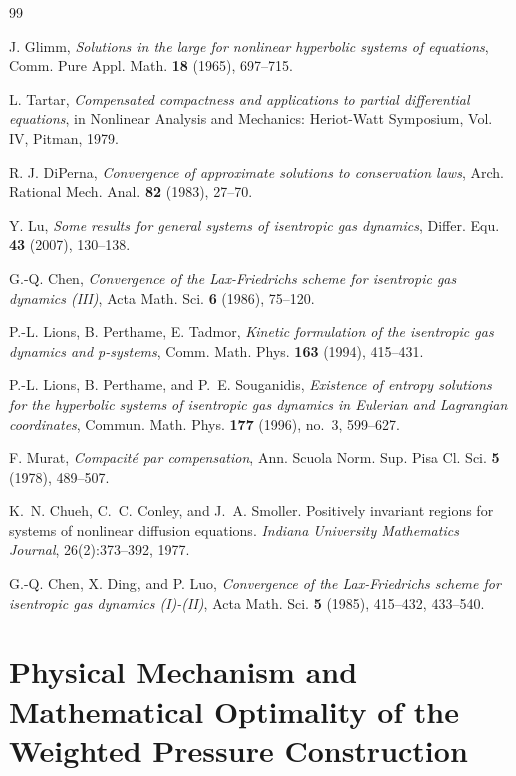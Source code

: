 \documentclass[12pt, reqno]{article}
\theoremstyle{definition}
\numberwithin{equation}{section}
\begin{document}
\begin{thebibliography}{99}

 J. Glimm, \textit{Solutions in the large for nonlinear hyperbolic systems of equations}, Comm. Pure Appl. Math. \textbf{18} (1965), 697--715.

 L. Tartar, \textit{Compensated compactness and applications to partial differential equations}, in Nonlinear Analysis and Mechanics: Heriot-Watt Symposium, Vol. IV, Pitman, 1979.

 R. J. DiPerna, \textit{Convergence of approximate solutions to conservation laws}, Arch. Rational Mech. Anal. \textbf{82} (1983), 27--70.

 Y. Lu, \textit{Some results for general systems of isentropic gas dynamics}, Differ. Equ. \textbf{43} (2007), 130--138. 

 G.-Q. Chen, \textit{Convergence of the Lax-Friedrichs scheme for isentropic gas dynamics (III)}, Acta Math. Sci. \textbf{6} (1986), 75--120.

 P.-L. Lions, B. Perthame, E. Tadmor, \textit{Kinetic formulation of the isentropic gas dynamics and p-systems}, Comm. Math. Phys. \textbf{163} (1994), 415--431. 

P.-L. Lions, B. Perthame, and P.~E. Souganidis,
\emph{Existence of entropy solutions for the hyperbolic systems of isentropic gas dynamics in Eulerian and Lagrangian coordinates},
Commun. Math. Phys. \textbf{177} (1996), no.~3, 599--627.

 F. Murat, \textit{Compacit\'e par compensation}, Ann. Scuola Norm. Sup. Pisa Cl. Sci. \textbf{5} (1978), 489--507.

K.~N. Chueh, C.~C. Conley, and J.~A. Smoller.
\newblock Positively invariant regions for systems of nonlinear diffusion equations.
\newblock \emph{Indiana University Mathematics Journal}, 26(2):373--392, 1977.

 G.-Q. Chen, X. Ding, and P. Luo, \textit{Convergence of the Lax-Friedrichs scheme for isentropic gas dynamics (I)-(II)}, Acta Math. Sci. \textbf{5} (1985), 415--432, 433--540.


\end{thebibliography}

\appendix

\section{Physical Mechanism and Mathematical Optimality of the Weighted Pressure Construction}
\label{app:optimality}
\end{document}
